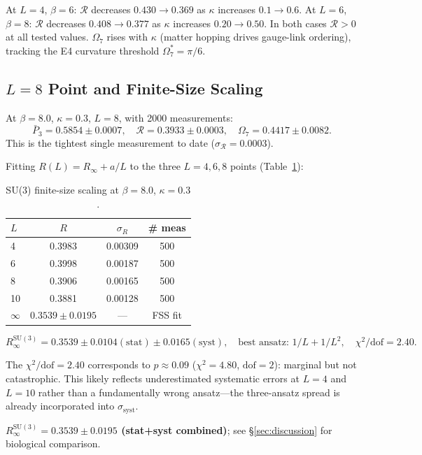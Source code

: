 \documentclass[12pt,a4paper]{article}
\newcommand{\R}{\mathcal{R}}           %
\newcommand{\SU}[1]{\mathrm{SU}(#1)}
\theoremstyle{plain}
\theoremstyle{definition}
\theoremstyle{remark}
\begin{document}
At $L=4$, $\beta=6$: $\R$ decreases $0.430\to0.369$ as $\kappa$ increases $0.1\to0.6$.
At $L=6$, $\beta=8$: $\R$ decreases $0.408\to0.377$ as $\kappa$ increases $0.20\to0.50$.
In both cases $\R>0$ at all tested values.
$\Omega_7$ rises with $\kappa$ (matter hopping drives gauge-link ordering), tracking the
E4 curvature threshold $\Omega_7^\ast=\pi/6$.

\subsection{$L=8$ Point and Finite-Size Scaling}

At $\beta=8.0$, $\kappa=0.3$, $L=8$, with 2000 measurements:
\[
  \bar{P}_3 = 0.5854\pm0.0007, \quad
  \R = 0.3933\pm0.0003, \quad
  \Omega_7 = 0.4417\pm0.0082.
\]
This is the tightest single measurement to date ($\sigma_\R=0.0003$).

Fitting $R(L)=R_\infty+a/L$ to the three $L=4,6,8$ points (Table~\ref{tab:su3_fss}):

\begin{table}[ht]
\centering
\caption{SU(3) finite-size scaling at $\beta=8.0$, $\kappa=0.3$.}
\label{tab:su3_fss}
\begin{tabular}{lccc}
\toprule
$L$ & $R$ & $\sigma_R$ & \# meas \\
\midrule
4 & 0.3983 & 0.00309 & 500 \\
6 & 0.3998 & 0.00187 & 500 \\
8 & 0.3906 & 0.00165 & 500 \\
10 & 0.3881 & 0.00128 & 500 \\
\midrule
$\infty$ & $\mathbf{0.3539\pm0.0195}$ & --- & FSS fit \\
\bottomrule
\end{tabular}
\end{table}

\[
  R_\infty^{\SU{3}} = 0.3539 \pm 0.0104(\text{stat}) \pm 0.0165(\text{syst}), \quad
  \text{best ansatz: } 1/L+1/L^2, \quad \chi^2/\text{dof} = 2.40.
\]

\noindent The $\chi^2/\text{dof}=2.40$ corresponds to $p\approx0.09$ ($\chi^2=4.80$,
$\text{dof}=2$): marginal but not catastrophic. This likely reflects underestimated
systematic errors at $L=4$ and $L=10$ rather than a fundamentally wrong ansatz---the
three-ansatz spread is already incorporated into $\sigma_\text{syst}$.

\textbf{$R_\infty^{\SU{3}} = 0.3539 \pm 0.0195$ (stat+syst combined)}; see §\ref{sec:discussion} for biological comparison.
\end{document}
